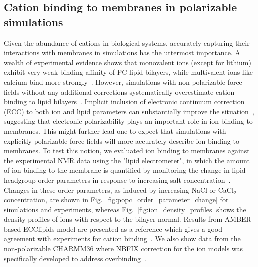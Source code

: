 \documentclass[journal=jctcce,manuscript=article,layout=singlecolumn]{achemso}
\begin{document}
\subsection{Cation binding to membranes in polarizable simulations}

Given the abundance of cations in biological systems, accurately capturing their interactions with membranes in simulations has the uttermost importance. A wealth of  experimental evidence shows that monovalent ions (except for lithium) exhibit very weak binding affinity of PC lipid bilayers, while multivalent ions like calcium bind more strongly~\cite{Catte2016}. However, simulations with non-polarizable force fields without any additional corrections systematically overestimate cation binding to lipid bilayers~\cite{Catte2016}. Implicit inclusion of electronic continuum correction (ECC) to both ion and lipid parameters can substantially improve the situation~\cite{Melcr:2018a,melcr2019improved,bacle21}, suggesting that electronic polarizability plays an important role in ion binding to membranes. This might further lead one to expect that simulations with explicitly polarizable force fields will more accurately describe ion binding to membranes.
To test this notion, we evaluated ion binding to membranes against the experimental NMR data using the "lipid electrometer", in which the amount of ion binding to the membrane is quantified by monitoring the change in lipid headgroup order parameters in response to increasing salt concentration~\cite{seelig87,Catte2016}. Changes in these order parameters, as induced by increasing NaCl or CaCl$_2$ concentration, are shown in Fig.~\ref{fig:popc_order_parameter_change} for simulations and experiments, whereas Fig.~\ref{fig:ion_density_profiles} shows the density profiles of ions with respect to the bilayer normal. Results from AMBER-based ECClipids model are presented as a reference which gives a good agreement with experiments for cation binding~\cite{Melcr:2018a}. We also show data from the non-polarizable CHARMM36 where NBFIX correction for the ion models was specifically developed to address overbinding~\cite{Venable2013,Han2018}.
\end{document}
